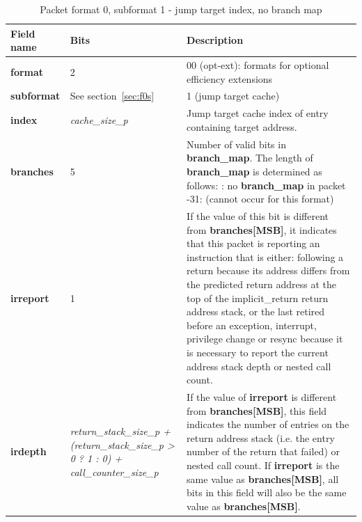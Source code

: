\begin{table}[htp]
  \centering
  \caption{Packet format 0, subformat 1 - jump target index, no branch map}
  \label{tab:te_inst0-1-cache-nomap}
  \begin{tabulary}{\textwidth}{|l|p{35mm}|p{80mm}|}
    \hline
    {\bf Field name} & {\bf Bits} & {\bf Description} \\
    \hline
    \textbf{format}	& 2	& 00 (opt-ext): formats for optional efficiency extensions\\
    \hline
     \textbf{subformat}  & See section~\ref{sec:f0s} & 1 (jump target cache)\\
     \hline
    \textbf{index} & \textit {\textit{cache\_size\_p}} & 
              Jump target cache index of entry containing target address.\\ 
    \hline
    \textbf{branches} & 5 & Number of valid bits in \textbf{branch\_map}. The length of \textbf{branch\_map} is determined as follows: :    no \textbf{branch\_map} in packet -31: (cannot occur for this format) \\
    \hline
    \textbf{irreport}	& 1 & 
                If the value of this bit is different from \textbf{branches[MSB]}, it indicates that this packet is
                reporting an instruction that is either: \newline
                following a return because its address differs from the predicted return address at the top of 
                the implicit\_return return address stack, or \newline
                the last retired before an exception, interrupt, privilege change or resync because it is necessary to report 
                the current address stack depth or nested call count. \\
    \hline
    \textbf{irdepth}	& \textit {return\_stack\_size\_p + (return\_stack\_size\_p > 0 ? 1 : 0) + call\_counter\_size\_p} & 
                If the value of \textbf{irreport} is different from \textbf{branches[MSB]}, this field 
		indicates the number of entries on the return address stack (i.e. the entry number of the return that
                failed) or nested call count.  If \textbf{irreport} is the same value as \textbf{branches[MSB]}, 
                all bits in this field  will also be the same value as \textbf{branches[MSB]}. \\
    \hline
  \end{tabulary}
\end{table}

